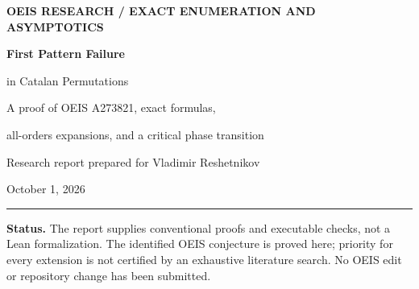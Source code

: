\documentclass[11pt]{article}
\numberwithin{equation}{section}
\theoremstyle{definition}
\newcommand{\Beta}{\operatorname{Beta}}
\begin{document}
\hypersetup{pageanchor=false}
\begin{titlepage}
\vspace*{0.6in}
{\sffamily\small\bfseries\color{muted} OEIS RESEARCH \quad / \quad EXACT ENUMERATION AND ASYMPTOTICS\par}
\vspace{0.45in}
{\sffamily\bfseries\color{ink}\fontsize{27}{33}\selectfont
First Pattern Failure\par
in Catalan Permutations\par}
\vspace{0.25in}
{\Large A proof of OEIS A273821, exact formulas,\par
all-orders expansions, and a critical phase transition\par}
\vspace{0.4in}
{\large Research report prepared for Vladimir Reshetnikov\par}
{\normalsize October 1, 2026\par}
\vspace{0.5in}
\hrule
\vspace{0.2in}
\begin{abstract}
For a uniformly chosen $123$-avoiding permutation of $[n]$, let $K_n$ be the
largest number of its largest entries whose induced permutation still avoids
$132$. The generating function for the joint counts $T(n,k)$ is marked
conjectural in OEIS A273821. We prove it by inserting successive minima,
then telescope the resulting Catalan convolution to obtain a difference of
two binomial coefficients. This resolves both the posted generating-function
conjecture and the indicated growth-rate question for every nonzero fixed
column.

The exact formula yields substantially more: every column $k\ge2$ is
hypergeometric in $n$; its full inverse-power expansion is computable to any
order; and $K_n$ has an explicit discrete limit law with exponentially
weighted total-variation error $O(n^{-1})$. The fixed-column approximation
changes at $k\asymp\sqrt n$, where we prove an explicit crossover. For
$k$ proportional to $n$, two distinct exponential sectors are separated
exactly rather than hidden under an algebraic error term.

Weighting permutations by $y^{K_n}$ produces a transition at $y=2$.
Below the transition $K_n$ stays bounded; above it $n-K_n$ stays bounded;
at the transition $K_n/n$ converges to $\Beta(1,\tfrac12)$. We give an exact
critical partition function and mean, a critical window, Lambert-$W$
inverse expansions, independent computation, and a formalization and research
agenda.
\end{abstract}
\vfill
{\small\color{muted}
\textbf{Status.} The report supplies conventional proofs and executable checks,
not a Lean formalization. The identified OEIS conjecture is proved here;
priority for every extension is not certified by an exhaustive literature
search. No OEIS edit or repository change has been submitted.\par}
\end{titlepage}
\hypersetup{pageanchor=true}
\end{document}

